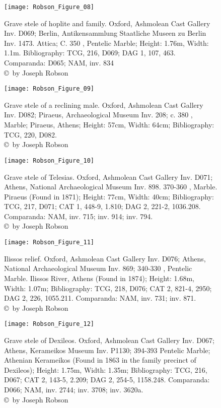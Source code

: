 \begin{figure}[!p]
	\texttt{[image: Robson\_Figure\_08]}

	\caption{Grave stele of hoplite and family. Oxford, Ashmolean Cast Gallery Inv. D069; Berlin, Antikensammlung Staatliche Museen zu Berlin Inv. 1473. Attica; C. 350 \BC, Pentelic Marble; Height: 1.76m, Width: 1.1m. Bibliography: TCG, 216, D069; DAG 1, 107, 463.
		Comparanda: D065; NAM, inv. 834
		{\normalfont\scriptsize \\ \copyright\ by Joseph Robson}}
	\label{fig:Robson_Figure_08}
\end{figure}
\clearpage
\begin{figure}[!p]
	\texttt{[image: Robson\_Figure\_09]}

	\caption{Grave stele of a reclining male. Oxford, Ashmolean Cast Gallery Inv. D082; Piraeus, Archaeological Museum Inv. 208; c. 380 \BC, Marble; Piraeus, Athens; Height: 57cm, Width: 64cm; Bibliography: TCG, 220, D082.
		{\normalfont\scriptsize \\ \copyright\ by Joseph Robson}}
	\label{fig:Robson_Figure_09}
\end{figure}
\clearpage
\begin{figure}[!p]
	\texttt{[image: Robson\_Figure\_10]}

	\caption{Grave stele of Telesias. Oxford, Ashmolean Cast Gallery Inv. D071; Athens, National Archaeological Museum Inv. 898. 370-360 \BC, Marble. Piraeus (Found in 1871); Height: 77cm, Width: 40cm; Bibliography: TCG, 217, D071; CAT 1, 448-9, 1.810; DAG 2, 221-2, 1036.208.
		Comparanda: NAM, inv. 715; inv. 914; inv. 794.
		{\normalfont\scriptsize \\ \copyright\ by Joseph Robson}}
	\label{fig:Robson_Figure_10}
\end{figure}
\clearpage
\begin{figure}[!p]
	\texttt{[image: Robson\_Figure\_11]}

	\caption{Ilissos relief. Oxford, Ashmolean Cast Gallery Inv. D076; Athens, National Archaeological Museum Inv. 869; 340-330 \BC, Pentelic Marble. Ilissos River, Athens (Found in 1874); Height: 1.68m, Width: 1.07m; Bibliography: TCG, 218, D076; CAT 2, 821-4, 2950; DAG 2, 226, 1055.211.
		Comparanda: NAM, inv. 731; inv. 871.
		{\normalfont\scriptsize \\ \copyright\ by Joseph Robson}}
	\label{fig:Robson_Figure_11}
\end{figure}
\clearpage
\begin{figure}[!p]
	\texttt{[image: Robson\_Figure\_12]}

	\caption{Grave stele of Dexileos. Oxford, Ashmolean Cast Gallery Inv. D067; Athens, Kerameikos Museum Inv. P1130; 394-393 \BC Pentelic Marble; Athenian Kerameikos (Found in 1863 in the family precinct of Dexileos); Height: 1.75m, Width: 1.35m; Bibliography: TCG, 216, D067; CAT 2, 143-5, 2.209; DAG 2, 254-5, 1158.248.
		Comparanda: D066; NAM, inv. 2744; inv. 3708; inv. 3620a.
		{\normalfont\scriptsize \\ \copyright\ by Joseph Robson}}
	\label{fig:Robson_Figure_12}
\end{figure}

